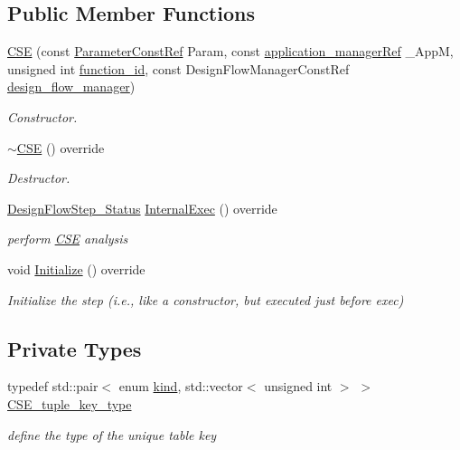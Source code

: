 \subsection*{Public Member Functions}
\begin{DoxyCompactItemize}
\item 
\hyperlink{classCSE_a0c288efafdfb4e2b4023d984e330b110}{C\+SE} (const \hyperlink{Parameter_8hpp_a37841774a6fcb479b597fdf8955eb4ea}{Parameter\+Const\+Ref} Param, const \hyperlink{application__manager_8hpp_a04ccad4e5ee401e8934306672082c180}{application\+\_\+manager\+Ref} \+\_\+\+AppM, unsigned int \hyperlink{classFunctionFrontendFlowStep_a58ef2383ad1a212a8d3f396625a4b616}{function\+\_\+id}, const Design\+Flow\+Manager\+Const\+Ref \hyperlink{classDesignFlowStep_ab770677ddf087613add30024e16a5554}{design\+\_\+flow\+\_\+manager})
\begin{DoxyCompactList}\small\item\em Constructor. \end{DoxyCompactList}\item 
\hyperlink{classCSE_ad2908703ed31dbc1be925fba3a6d9367}{$\sim$\+C\+SE} () override
\begin{DoxyCompactList}\small\item\em Destructor. \end{DoxyCompactList}\item 
\hyperlink{design__flow__step_8hpp_afb1f0d73069c26076b8d31dbc8ebecdf}{Design\+Flow\+Step\+\_\+\+Status} \hyperlink{classCSE_adbf292294aa82603ea2189ddf1293508}{Internal\+Exec} () override
\begin{DoxyCompactList}\small\item\em perform \hyperlink{classCSE}{C\+SE} analysis \end{DoxyCompactList}\item 
void \hyperlink{classCSE_a6bb59a891291b3ecfec7072ce1b2d77d}{Initialize} () override
\begin{DoxyCompactList}\small\item\em Initialize the step (i.\+e., like a constructor, but executed just before exec) \end{DoxyCompactList}\end{DoxyCompactItemize}
\subsection*{Private Types}
\begin{DoxyCompactItemize}
\item 
typedef std\+::pair$<$ enum \hyperlink{tree__common_8hpp_a9efbd7c7191fb190b76c2fd05d6e7b45}{kind}, std\+::vector$<$ unsigned int $>$ $>$ \hyperlink{classCSE_a541f4bbb7540d84d1ed98f9c44b74417}{C\+S\+E\+\_\+tuple\+\_\+key\+\_\+type}
\begin{DoxyCompactList}\small\item\em define the type of the unique table key \end{DoxyCompactList}\end{DoxyCompactItemize}

